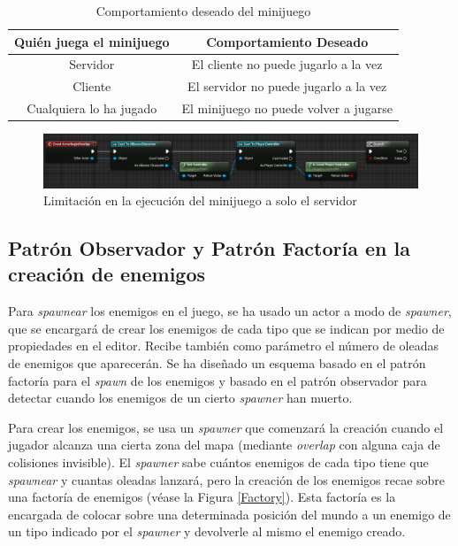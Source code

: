 \begin{itemize}
\begin{table}[H]
\centering
\begin{tabular}{|c|c|}
\hline
\textbf{Quién juega el minijuego} & \textbf{Comportamiento Deseado}        \\ \hline
Servidor                          & El cliente no puede jugarlo a la vez   \\ \hline
Cliente                           & El servidor no puede jugarlo a la vez  \\ \hline
Cualquiera lo ha jugado           & El minijuego no puede volver a jugarse \\ \hline
\end{tabular}
\caption{Comportamiento deseado del minijuego}
\label{Behaviour}
\end{table}

\begin{figure}[H]
  \centering
  \includegraphics[width=13cm]{./images/LimitacionMinijuego.png}
  \caption{Limitación en la ejecución del minijuego a solo el servidor}
  \label{Limitation}
\end{figure}
\end{itemize}

\subsection{Patrón Observador y Patrón Factoría en la creación de enemigos}

Para \textit{spawnear} los enemigos en el juego, se ha usado un actor a modo de \textit{spawner}, que se encargará de crear los enemigos de cada tipo que se indican por medio de propiedades en el editor. Recibe también como parámetro el número de oleadas de enemigos que aparecerán. Se ha diseñado un esquema basado en el patrón factoría para el \textit{spawn} de los enemigos y basado en el patrón observador para detectar cuando los enemigos de un cierto \textit{spawner} han muerto.

Para crear los enemigos, se usa un \textit{spawner} que comenzará la creación cuando el jugador alcanza una cierta zona del mapa (mediante \textit{overlap} con alguna caja de colisiones invisible). El \textit{spawner} sabe cuántos enemigos de cada tipo tiene que \textit{spawnear} y cuantas oleadas lanzará, pero la creación de los enemigos recae sobre una factoría de enemigos (véase la Figura \ref{Factory}). Esta factoría es la encargada de colocar sobre una determinada posición del mundo a un enemigo de un tipo indicado por el \textit{spawner} y devolverle al mismo el enemigo creado.

